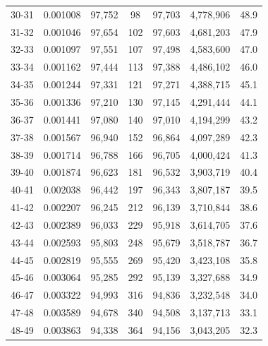 \documentclass[10pt,a4paper]{article}
\begin{document}
\begin{longtable}{|c|c|c|c|c|c|c|}
30-31  & 0.001008      & 97,752       & 98            & 97,703        & 4,778,906    & 48.9         \\
31-32  & 0.001046      & 97,654       & 102           & 97,603        & 4,681,203    & 47.9         \\
32-33  & 0.001097      & 97,551       & 107           & 97,498        & 4,583,600    & 47.0         \\
33-34  & 0.001162      & 97,444       & 113           & 97,388        & 4,486,102    & 46.0         \\
34-35  & 0.001244      & 97,331       & 121           & 97,271        & 4,388,715    & 45.1         \\
35-36  & 0.001336      & 97,210       & 130           & 97,145        & 4,291,444    & 44.1         \\
36-37  & 0.001441      & 97,080       & 140           & 97,010        & 4,194,299    & 43.2         \\
37-38  & 0.001567      & 96,940       & 152           & 96,864        & 4,097,289    & 42.3         \\
38-39  & 0.001714      & 96,788       & 166           & 96,705        & 4,000,424    & 41.3         \\
39-40  & 0.001874      & 96,623       & 181           & 96,532        & 3,903,719    & 40.4         \\
40-41  & 0.002038      & 96,442       & 197           & 96,343        & 3,807,187    & 39.5         \\
41-42  & 0.002207      & 96,245       & 212           & 96,139        & 3,710,844    & 38.6         \\
42-43  & 0.002389      & 96,033       & 229           & 95,918        & 3,614,705    & 37.6         \\
43-44  & 0.002593      & 95,803       & 248           & 95,679        & 3,518,787    & 36.7         \\
44-45  & 0.002819      & 95,555       & 269           & 95,420        & 3,423,108    & 35.8         \\
45-46  & 0.003064      & 95,285       & 292           & 95,139        & 3,327,688    & 34.9         \\
46-47  & 0.003322      & 94,993       & 316           & 94,836        & 3,232,548    & 34.0         \\
47-48  & 0.003589      & 94,678       & 340           & 94,508        & 3,137,713    & 33.1         \\
48-49  & 0.003863      & 94,338       & 364           & 94,156        & 3,043,205    & 32.3         \\

\end{longtable}
\end{document}
